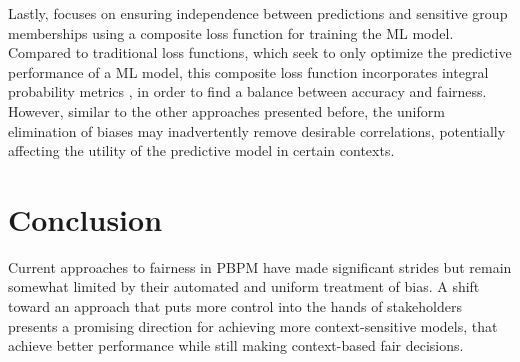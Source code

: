 Lastly, \cite{fairness_independence} focuses on ensuring independence
between predictions and sensitive group memberships using a composite loss function for training the ML model.
Compared to traditional loss functions, which seek to only optimize the predictive performance of a ML model,
this composite loss function incorporates integral probability metrics \cite{ipm},
in order to find a balance between accuracy and fairness.
However, similar to the other approaches presented before,
the uniform elimination of biases may inadvertently remove desirable correlations,
potentially affecting the utility of the predictive model in certain contexts.

\section{Conclusion}
Current approaches to fairness in PBPM have made significant strides
but remain somewhat limited by their automated and uniform treatment of bias.
A shift toward an approach that puts more control into the hands of stakeholders
presents a promising direction for achieving more context-sensitive models,
that achieve better performance while still making context-based fair decisions.